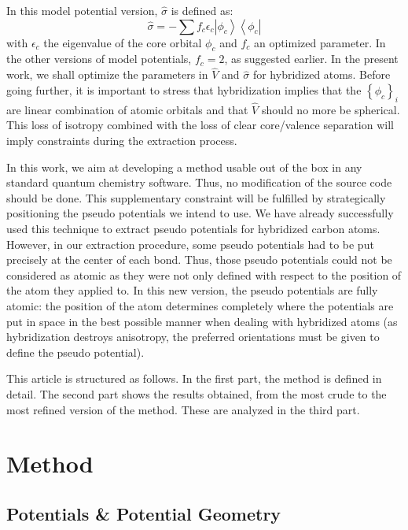 \documentclass[journal=jctcce,manuscript=article]{achemso}
\begin{document}
In this model potential version, $\hat{\sigma}$ is defined as:
\begin{equation}
\label{eq:HuzinagaMPVersion1Sigma}
\hat{\sigma} = -\sum f_c\epsilon_c\left|\phi_c\right>\left<\phi_c\right|
\end{equation}
with $\epsilon_c$ the eigenvalue of the core orbital $\phi_c$ and
$f_c$ an optimized parameter.
In the other versions of model potentials, $f_c=2$, as suggested earlier.\cite{houjer_aspects_1978}
In the present work, we shall optimize the parameters in $\hat{V}$ and $\hat{\sigma}$
for hybridized atoms.
Before going further, it is important to stress that hybridization implies that the
$\left\{\phi_c\right\}_i$ are linear combination of atomic orbitals and that
$\hat{V}$ should no more be spherical.
This loss of isotropy combined with the loss of clear core/valence separation
will imply constraints during the extraction process.

In this work, we aim at developing a method usable out of the box in any standard
quantum chemistry software.
Thus, no modification of the source code should be done.
This supplementary constraint will be fulfilled by strategically positioning the pseudo potentials
we intend to use. 
We have already successfully used this technique to extract pseudo potentials for hybridized carbon
atoms.\cite{drujon_pseudopotentials_2013}
However, in our extraction procedure, some pseudo potentials had to be put precisely at the center
of each bond.
Thus, those pseudo potentials could not be considered as atomic as they were not only defined
with respect to the position of the atom they applied to.
In this new version, the pseudo potentials are fully atomic: the position of the atom
determines completely where the potentials are put in space in the best possible manner
when dealing with hybridized atoms (as hybridization destroys anisotropy, the preferred orientations
must be given to define the pseudo potential).

This article is structured as follows.
In the first part, the method is defined in detail.
The second part shows the results obtained, from the most crude to the most refined
version of the method.
These are analyzed in the third part.

\section{Method}

\subsection{Potentials \& Potential Geometry}
\end{document}
